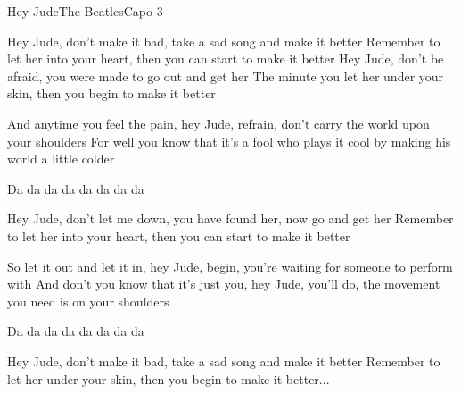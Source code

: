 \begin{song}{Hey Jude}{The Beatles}{Capo 3}

Hey Jude, don't make it bad, take a sad song and make it better
Remember to let her into your heart, then you can start to make it better
Hey Jude, don't be afraid, you were made to   go out and get her
The minute you let her under your skin, then you begin to make it better

And anytime you feel the pain, hey Jude, refrain, don't carry the world upon your
shoulders
For well you know that it's a fool who plays it cool by making his world a little
colder

Da da da da da da da da

Hey Jude, don't let me down, you have found her,  now go and get her
Remember to let her into your heart, then you can start to make it better

So let it out and let it in, hey Jude, begin, you're waiting for someone to perform with
And don't you know that it's just you, hey Jude, you'll do, the movement you need is
on your shoulders

Da da da da da da da da

Hey Jude, don't make it bad, take a sad song  and make it better
Remember to let her under your skin, then you begin to make it better...


\end{song}
